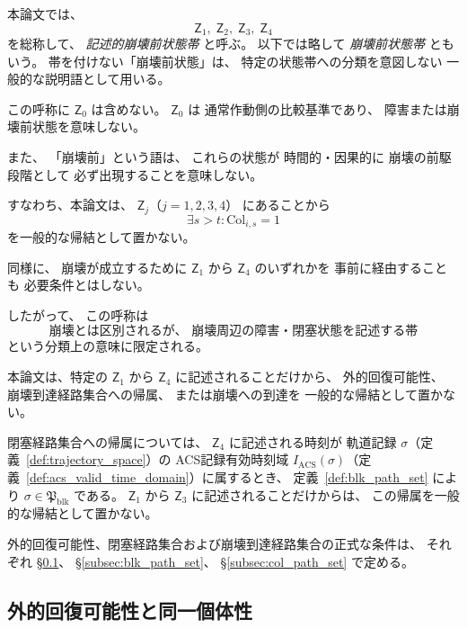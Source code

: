 \begin{remark}[崩壊前状態帯という呼称の用法]
\label{rem:precollapse_terminology}
本論文では、
\[
  \mathsf{Z}_1,\;
  \mathsf{Z}_2,\;
  \mathsf{Z}_3,\;
  \mathsf{Z}_4
\]
を総称して、
\emph{記述的崩壊前状態帯}
と呼ぶ。
以下では略して
\emph{崩壊前状態帯}
ともいう。
帯を付けない「崩壊前状態」は、
特定の状態帯への分類を意図しない
一般的な説明語として用いる。

この呼称に
$\mathsf{Z}_0$
は含めない。
$\mathsf{Z}_0$ は
通常作動側の比較基準であり、
障害または崩壊前状態を意味しない。

また、
「崩壊前」という語は、
これらの状態が
時間的・因果的に
崩壊の前駆段階として
必ず出現することを意味しない。

すなわち、本論文は、
$\mathsf{Z}_j$（$j=1,2,3,4$）
にあることから
\[
  \exists s>t:
  \mathrm{Col}_{i,s}=1
\]
を一般的な帰結として置かない。

同様に、
崩壊が成立するために
$\mathsf{Z}_1$ から
$\mathsf{Z}_4$ のいずれかを
事前に経由することも
必要条件とはしない。

したがって、
この呼称は
\[
  \text{崩壊とは区別されるが、
  崩壊周辺の障害・閉塞状態を記述する帯}
\]
という分類上の意味に限定される。
\end{remark}

\begin{remark}
\label{rem:zones_no_path_implication}
本論文は、特定の
$\mathsf{Z}_1$ から
$\mathsf{Z}_4$
に記述されることだけから、
外的回復可能性、
崩壊到達経路集合への帰属、
または崩壊への到達を
一般的な帰結として置かない。

閉塞経路集合への帰属については、
$\mathsf{Z}_4$ に記述される時刻が
軌道記録 $\sigma$（定義~\ref{def:trajectory_space}）の
ACS記録有効時刻域 $I_{\mathrm{ACS}}(\sigma)$（定義~\ref{def:acs_valid_time_domain}）に属するとき、
定義~\ref{def:blk_path_set} により
$\sigma\in\mathfrak{P}_{\mathrm{blk}}$ である。
$\mathsf{Z}_1$ から $\mathsf{Z}_3$ に記述されることだけからは、
この帰属を一般的な帰結として置かない。

外的回復可能性、閉塞経路集合および崩壊到達経路集合の正式な条件は、
それぞれ
\S\ref{subsec:external_recovery}、
\S\ref{subsec:blk_path_set}、
\S\ref{subsec:col_path_set}
で定める。
\end{remark}

\subsection{外的回復可能性と同一個体性}
\label{subsec:external_recovery}


